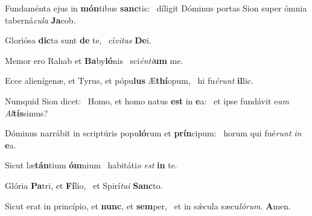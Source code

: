 \item Fundaménta ejus in \textbf{món}tibus \textbf{sanc}tis:~\psstar{} díligit Dóminus portas Sion super ómnia taberná\textit{cula} \textbf{Ja}cob.
\item Gloriósa \textbf{dic}ta sunt \textbf{de} te,~\psstar{} cí\textit{vitas} \textbf{De}i.
\item Memor ero Rahab et \textbf{Ba}by\textbf{ló}nis~\psstar{} sci\textit{énti}\textbf{um} me.
\item Ecce alienígenæ, et Tyrus, et pópu\textbf{lus} Æ\textbf{thí}opum,~\psstar{} hi fu\textit{érunt} \textbf{il}lic.
\item Numquid Sion dicet:~\pscross{} Homo, et homo natus \textbf{est} in \textbf{e}a:~\psstar{} et ipse fundávit e\textit{am} \textit{Al}\textbf{tís}simus?
\item Dóminus narrábit in scriptúris popu\textbf{ló}rum et \textbf{prín}cipum:~\psstar{} horum qui fué\textit{runt} \textit{in} \textbf{e}a.
\item Sicut læ\textbf{tán}tium \textbf{óm}nium~\psstar{} habitáti\textit{o} \textit{est} \textbf{in} te.
\item Glória \textbf{Pa}tri, et \textbf{Fí}lio,~\psstar{} et Spirí\textit{tui} \textbf{Sanc}to.
\item Sicut erat in princípio, et \textbf{nunc}, et \textbf{sem}per,~\psstar{} et in sǽcula sæcu\textit{lórum}. \textbf{A}men.
